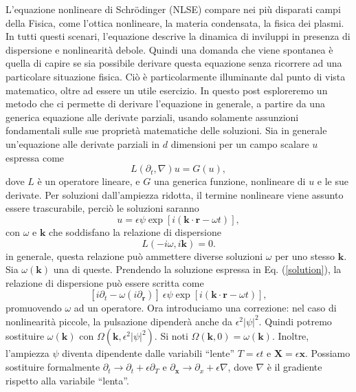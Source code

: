 \documentclass[10pt]{article}
\begin{document}
L'equazione nonlineare di Schrödinger (NLSE) compare nei più disparati campi della Fisica, come l'ottica nonlineare, la materia condensata, la fisica dei plasmi. In tutti questi scenari, l'equazione descrive la dinamica di inviluppi in presenza di dispersione e nonlinearità debole. Quindi una domanda che viene spontanea è quella di capire se sia possibile derivare questa equazione senza ricorrere ad una particolare situazione fisica. Ciò è particolarmente illuminante dal punto di vista matematico, oltre ad essere un utile esercizio. In questo post esploreremo un metodo che ci permette di derivare l'equazione in generale, a partire da una generica equazione alle derivate parziali, usando solamente assunzioni fondamentali sulle sue proprietà matematiche delle soluzioni. 
Sia in generale un'equazione alle derivate parziali in $d$ dimensioni per un campo scalare $u$ espressa come 
\begin{equation}
	L(\partial_t, \nabla)u = G(u),
\end{equation}
dove $L$ è un operatore lineare, e $G$ una generica funzione, nonlineare di $u$ e le sue derivate.
Per soluzioni dall'ampiezza ridotta, il termine nonlineare viene assunto essere trascurabile, perciò le soluzioni saranno
\begin{equation}\label{solution}
	u = \epsilon\psi \exp[i(\mathbf{k} \cdot \mathbf{r} - \omega t)],
\end{equation}
con $\omega$ e $\mathbf{k}$ che soddisfano la relazione di dispersione
\begin{equation}
	L(-i\omega, i\mathbf{k}) = 0.
\end{equation}
in generale, questa relazione può ammettere diverse soluzioni $\omega$ per uno stesso $\mathbf{k}$. Sia $\omega(\mathbf{k})$ una di queste.
Prendendo la soluzione espressa in Eq. (\ref{solution}), la relazione di dispersione può essere scritta come 
\begin{equation}\label{dispersion}
	[i\partial_t - \omega(i\partial_{\mathbf{r}})] \ \epsilon\psi\exp[i(\mathbf{k} \cdot \mathbf{r} - \omega t)],
\end{equation}
promuovendo $\omega$ ad un operatore.
Ora introduciamo una correzione: nel caso di nonlinearità piccole, la pulsazione dipenderà anche da $\epsilon^2 |\psi|^2$. Quindi potremo sostituire $\omega(\mathbf{k})$ con $\Omega(\mathbf{k}, \epsilon^2|\psi|^2)$. Si noti $\Omega(\mathbf{k}, 0)=\omega(\mathbf{k})$.
Inoltre, l'ampiezza $\psi$ diventa dipendente dalle variabili ``lente'' $T=\epsilon t$ e $\mathbf{X} = \epsilon \mathbf{x}$. Possiamo sostituire formalmente $\partial_t \longrightarrow \partial_t + \epsilon\partial_T$ e $\partial_{\mathbf{x}} \longrightarrow \partial_{x}+\epsilon \nabla$, dove $\nabla$ è il gradiente rispetto alla variabile ``lenta''. 
\end{document}
